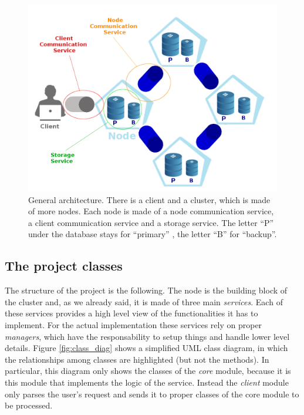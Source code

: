 \documentclass{article}
\begin{document}
\begin{figure}[h]
\includegraphics[scale=0.4]{architecture}
\caption{General architecture. There is a client and a cluster, which is made of more nodes. Each node is made of a node communication service, a client communication service and a storage service. The letter ``P'' under the database stays for ``primary'' , the letter ``B'' for ``backup''.}
\label{fig:architecture}
\end{figure}

\subsection{The project classes} 
The structure of the project is the following. The node is the building block of the cluster and, as we already said, it is made of three main \textit{services}. Each of these services provides a high level view of the functionalities it has to implement. For the actual implementation these services rely on proper \textit{managers}, which have the responsability to setup things and handle lower level details. Figure \ref{fig:class_diag} shows a simplified UML class diagram, in which the relationships among classes are highlighted (but not the methods). In particular, this diagram only shows the classes of the \textit{core} module, because it is this module that implements the logic of the service. Instead the \textit{client} module only parses the user's request and sends it to proper classes of the core module to be processed. \\
\end{document}
